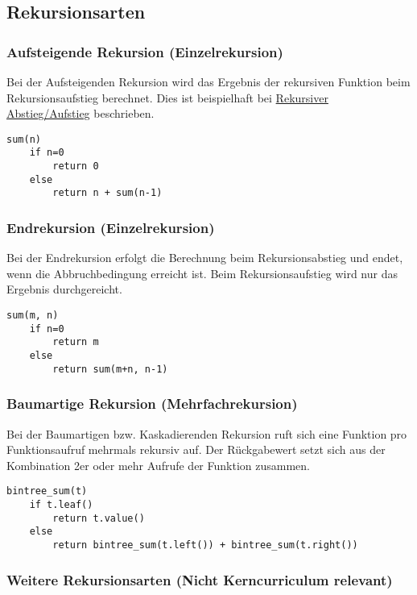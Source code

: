 \subsection{Rekursionsarten}

\subsubsection{Aufsteigende Rekursion (Einzelrekursion)}

Bei der Aufsteigenden Rekursion wird das Ergebnis der rekursiven Funktion
beim Rekursionsaufstieg berechnet. Dies ist beispielhaft bei \hyperref[sec:rekursion_ab_auf]{Rekursiver Abstieg/Aufstieg} beschrieben.

\begin{lstlisting}
sum(n)
    if n=0
        return 0
    else
        return n + sum(n-1)
\end{lstlisting}

\subsubsection{Endrekursion (Einzelrekursion)}

Bei der Endrekursion erfolgt die Berechnung beim Rekursionsabstieg und endet,
wenn die Abbruchbedingung erreicht ist. Beim Rekursionsaufstieg wird nur das
Ergebnis durchgereicht.

\begin{lstlisting}
sum(m, n)
    if n=0
        return m
    else
        return sum(m+n, n-1)
\end{lstlisting}

\subsubsection{Baumartige Rekursion (Mehrfachrekursion)}

Bei der Baumartigen bzw. Kaskadierenden Rekursion ruft sich eine Funktion pro Funktionsaufruf
mehrmals rekursiv auf. Der Rückgabewert setzt sich aus der Kombination 2er oder mehr Aufrufe
der Funktion zusammen.

\begin{lstlisting}
bintree_sum(t)
    if t.leaf()
        return t.value()
    else
        return bintree_sum(t.left()) + bintree_sum(t.right())
\end{lstlisting}

\subsubsection{Weitere Rekursionsarten (Nicht Kerncurriculum relevant)}

